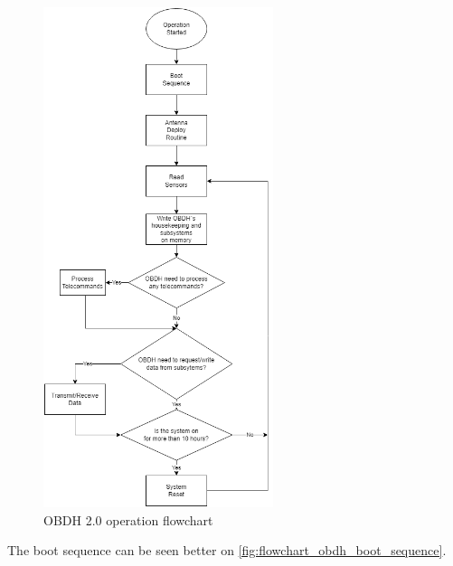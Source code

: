 \begin{figure}[!ht]
    \begin{center}
        \includegraphics[width=0.6\textwidth]{figures/flowchart_OBDH.drawio.png}
        \caption{OBDH 2.0 operation flowchart}
        \label{fig:flowchart_OBDH}
    \end{center}
\end{figure}

The boot sequence can be seen better on \autoref{fig:flowchart_obdh_boot_sequence}.

